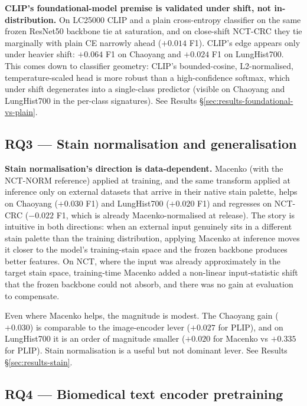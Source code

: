 \textbf{CLIP's foundational-model premise is validated under shift, not in-distribution.} On LC25000 CLIP and a plain cross-entropy classifier on the same frozen ResNet50 backbone tie at saturation, and on close-shift NCT-CRC they tie marginally with plain CE narrowly ahead ($+0.014$ F1). CLIP's edge appears only under heavier shift: $+0.064$ F1 on Chaoyang and $+0.024$ F1 on LungHist700. This comes down to classifier geometry: CLIP's bounded-cosine, L2-normalised, temperature-scaled head is more robust than a high-confidence softmax, which under shift degenerates into a single-class predictor (visible on Chaoyang and LungHist700 in the per-class signatures). See Results §\ref{sec:results-foundational-vs-plain}.

\subsection*{RQ3 --- Stain normalisation and generalisation}

\textbf{Stain normalisation's direction is data-dependent.} Macenko (with the NCT-NORM reference) applied at training, and the same transform applied at inference only on external datasets that arrive in their native stain palette, helps on Chaoyang ($+0.030$ F1) and LungHist700 ($+0.020$ F1) and regresses on NCT-CRC ($-0.022$ F1, which is already Macenko-normalised at release). The story is intuitive in both directions: when an external input genuinely sits in a different stain palette than the training distribution, applying Macenko at inference moves it closer to the model's training-stain space and the frozen backbone produces better features. On NCT, where the input was already approximately in the target stain space, training-time Macenko added a non-linear input-statistic shift that the frozen backbone could not absorb, and there was no gain at evaluation to compensate.

Even where Macenko helps, the magnitude is modest. The Chaoyang gain ($+0.030$) is comparable to the image-encoder lever ($+0.027$ for PLIP), and on LungHist700 it is an order of magnitude smaller ($+0.020$ for Macenko vs $+0.335$ for PLIP). Stain normalisation is a useful but not dominant lever. See Results §\ref{sec:results-stain}.

\subsection*{RQ4 --- Biomedical text encoder pretraining}

